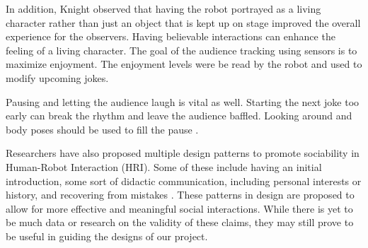 \documentclass[onecolumn, draftclsnofoot,10pt, compsoc]{IEEEtran}
\begin{document}
In addition, Knight observed that having the robot portrayed as a living character rather than just an object that is kept up on stage improved the overall experience for the observers. Having believable interactions can enhance the feeling of a living character.
The goal of the audience tracking using sensors is to maximize enjoyment. The enjoyment levels were be read by the robot and used to modify upcoming jokes.{\cite{KnightEightLessons:2011}}

Pausing and letting the audience laugh is vital as well. Starting the next joke too early can break the rhythm and leave the audience baffled. Looking around and body poses should be used to fill the pause {\cite{KnightEightLessons:2011}}.

Researchers have also proposed multiple design patterns to promote sociability in Human-Robot Interaction (HRI). Some of these include having an initial introduction, some sort of didactic communication, including personal interests or history, and recovering from mistakes \cite{Kahn:2008}. These patterns in design are proposed to allow for more effective and meaningful social interactions. While there is yet to be much data or research on the validity of these claims, they may still prove to be useful in guiding the designs of our project.
\pagebreak
\end{document}
